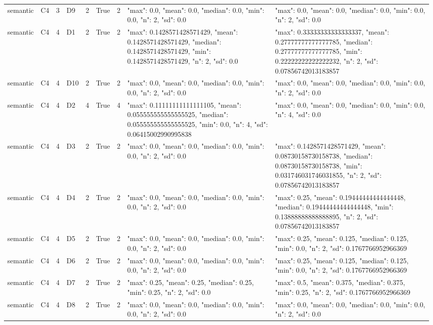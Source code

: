 \begin{tabular}{lllllllll}
semantic & C4 & 3 & D9 & 2 & True & 2 & {"max": 0.0, "mean": 0.0, "median": 0.0, "min": 0.0, "n": 2, "sd": 0.0} & {"max": 0.0, "mean": 0.0, "median": 0.0, "min": 0.0, "n": 2, "sd": 0.0} \\
semantic & C4 & 4 & D1 & 2 & True & 2 & {"max": 0.1428571428571429, "mean": 0.1428571428571429, "median": 0.1428571428571429, "min": 0.1428571428571429, "n": 2, "sd": 0.0} & {"max": 0.33333333333333337, "mean": 0.27777777777777785, "median": 0.27777777777777785, "min": 0.22222222222222232, "n": 2, "sd": 0.07856742013183857} \\
semantic & C4 & 4 & D10 & 2 & True & 2 & {"max": 0.0, "mean": 0.0, "median": 0.0, "min": 0.0, "n": 2, "sd": 0.0} & {"max": 0.0, "mean": 0.0, "median": 0.0, "min": 0.0, "n": 2, "sd": 0.0} \\
semantic & C4 & 4 & D2 & 4 & True & 4 & {"max": 0.11111111111111105, "mean": 0.055555555555555525, "median": 0.055555555555555525, "min": 0.0, "n": 4, "sd": 0.06415002990995838} & {"max": 0.0, "mean": 0.0, "median": 0.0, "min": 0.0, "n": 4, "sd": 0.0} \\
semantic & C4 & 4 & D3 & 2 & True & 2 & {"max": 0.0, "mean": 0.0, "median": 0.0, "min": 0.0, "n": 2, "sd": 0.0} & {"max": 0.1428571428571429, "mean": 0.08730158730158738, "median": 0.08730158730158738, "min": 0.031746031746031855, "n": 2, "sd": 0.07856742013183857} \\
semantic & C4 & 4 & D4 & 2 & True & 2 & {"max": 0.0, "mean": 0.0, "median": 0.0, "min": 0.0, "n": 2, "sd": 0.0} & {"max": 0.25, "mean": 0.19444444444444448, "median": 0.19444444444444448, "min": 0.13888888888888895, "n": 2, "sd": 0.07856742013183857} \\
semantic & C4 & 4 & D5 & 2 & True & 2 & {"max": 0.0, "mean": 0.0, "median": 0.0, "min": 0.0, "n": 2, "sd": 0.0} & {"max": 0.25, "mean": 0.125, "median": 0.125, "min": 0.0, "n": 2, "sd": 0.1767766952966369} \\
semantic & C4 & 4 & D6 & 2 & True & 2 & {"max": 0.0, "mean": 0.0, "median": 0.0, "min": 0.0, "n": 2, "sd": 0.0} & {"max": 0.25, "mean": 0.125, "median": 0.125, "min": 0.0, "n": 2, "sd": 0.1767766952966369} \\
semantic & C4 & 4 & D7 & 2 & True & 2 & {"max": 0.25, "mean": 0.25, "median": 0.25, "min": 0.25, "n": 2, "sd": 0.0} & {"max": 0.5, "mean": 0.375, "median": 0.375, "min": 0.25, "n": 2, "sd": 0.1767766952966369} \\
semantic & C4 & 4 & D8 & 2 & True & 2 & {"max": 0.0, "mean": 0.0, "median": 0.0, "min": 0.0, "n": 2, "sd": 0.0} & {"max": 0.0, "mean": 0.0, "median": 0.0, "min": 0.0, "n": 2, "sd": 0.0} \\

\end{tabular}
